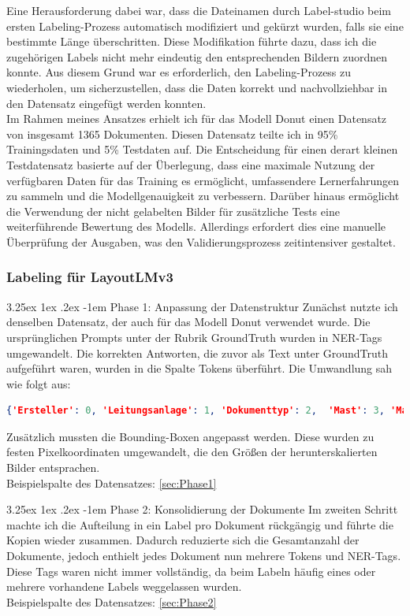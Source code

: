 \documentclass[12pt,a4paper,twoside]{article}
\makeatletter
\renewcommand\paragraph{\@startsection{paragraph}{5}{\z@}%
  {3.25ex \@plus1ex \@minus.2ex}%
  {-1em}%
  {\normalfont\normalsize\bfseries}}
\makeatother
\begin{document}
Eine Herausforderung dabei war, dass die Dateinamen durch Label-studio beim ersten Labeling-Prozess automatisch modifiziert und gekürzt wurden, falls sie eine bestimmte Länge überschritten. Diese Modifikation führte dazu, dass ich die zugehörigen Labels nicht mehr eindeutig den entsprechenden Bildern zuordnen konnte. Aus diesem Grund war es erforderlich, den Labeling-Prozess zu wiederholen, um sicherzustellen, dass die Daten korrekt und nachvollziehbar in den Datensatz eingefügt werden konnten.\\
Im Rahmen meines Ansatzes erhielt ich für das Modell Donut einen Datensatz von insgesamt 1365 Dokumenten. Diesen Datensatz teilte ich in 95\% Trainingsdaten und 5\% Testdaten auf. Die Entscheidung für einen derart kleinen Testdatensatz basierte auf der Überlegung, dass eine maximale Nutzung der verfügbaren Daten für das Training es ermöglicht, umfassendere Lernerfahrungen zu sammeln und die Modellgenauigkeit zu verbessern. Darüber hinaus ermöglicht die Verwendung der nicht gelabelten Bilder für zusätzliche Tests eine weiterführende Bewertung des Modells. Allerdings erfordert dies eine manuelle Überprüfung der Ausgaben, was den Validierungsprozess zeitintensiver gestaltet.

\subsubsection{Labeling für LayoutLMv3}
\paragraph{Phase 1: Anpassung der Datenstruktur}
Zunächst nutzte ich denselben Datensatz, der auch für das Modell Donut verwendet wurde. Die ursprünglichen Prompts unter der Rubrik GroundTruth wurden in NER-Tags umgewandelt. Die korrekten Antworten, die zuvor als Text unter GroundTruth aufgeführt waren, wurden in die Spalte Tokens überführt. Die Umwandlung sah wie folgt aus:
\begin{lstlisting}[language=json,firstnumber=1]
{'Ersteller': 0, 'Leitungsanlage': 1, 'Dokumenttyp': 2,  'Mast': 3, 'Maßstab': 4}
\end{lstlisting}
Zusätzlich mussten die Bounding-Boxen angepasst werden. Diese wurden zu festen Pixelkoordinaten umgewandelt, die den Größen der herunterskalierten Bilder entsprachen.\\
Beispielspalte des Datensatzes:
\ref{sec:Phase1}



\paragraph{Phase 2: Konsolidierung der Dokumente}
Im zweiten Schritt machte ich die Aufteilung in ein Label pro Dokument rückgängig und führte die Kopien wieder zusammen. Dadurch reduzierte sich die Gesamtanzahl der Dokumente, jedoch enthielt jedes Dokument nun mehrere Tokens und NER-Tags. Diese Tags waren nicht immer vollständig, da beim Labeln häufig eines oder mehrere vorhandene Labels weggelassen wurden.\\
Beispielspalte des Datensatzes:
\ref{sec:Phase2}
\end{document}
